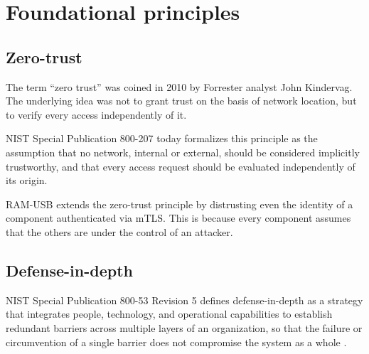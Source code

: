 \chapter{Foundational principles}
\label{chap:principi-fondanti}

\section{Zero-trust}
\label{sec:sota-zero-trust}

The term ``zero trust'' was coined in 2010 by Forrester analyst John Kindervag. The underlying idea
was not to grant trust on the basis of network location, but to verify every access
independently of it.

NIST Special Publication 800-207 \cite{nist-sp-800-207} today formalizes this principle as the assumption that no network,
internal or external, should be considered implicitly trustworthy, and that every access request
should be evaluated independently of its origin.

RAM-USB extends the zero-trust principle by distrusting even the identity of a component authenticated via mTLS.
This is because every component assumes that the others are under the control of an attacker.


\section{Defense-in-depth}
\label{sec:sota-defence-in-depth}

NIST Special Publication 800-53 Revision 5 defines defense-in-depth as a strategy that integrates
people, technology, and operational capabilities to establish redundant barriers across multiple layers of
an organization, so that the failure or circumvention of a single barrier does not compromise the system
as a whole \cite{nist-sp-800-53r5}.
